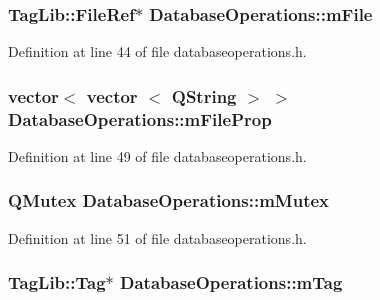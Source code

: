 \hypertarget{class_database_operations_af61f0200ac06733bbd9276faf9fa4488}{
\subsubsection[{m\-File}]{\setlength{\rightskip}{0pt plus 5cm}Tag\-Lib\-::\-File\-Ref$\ast$ Database\-Operations\-::m\-File\hspace{0.3cm}{\ttfamily [protected]}}}\label{class_database_operations_af61f0200ac06733bbd9276faf9fa4488}


Definition at line 44 of file databaseoperations.\-h.

\hypertarget{class_database_operations_a27137305ac34557b97fdffd8e17a9be2}{
\subsubsection[{m\-File\-Prop}]{\setlength{\rightskip}{0pt plus 5cm}vector$<$ vector $<$ Q\-String $>$ $>$ Database\-Operations\-::m\-File\-Prop\hspace{0.3cm}{\ttfamily [protected]}}}\label{class_database_operations_a27137305ac34557b97fdffd8e17a9be2}


Definition at line 49 of file databaseoperations.\-h.

\hypertarget{class_database_operations_a527401ca7671c2856b6368cad0c1c3a7}{
\subsubsection[{m\-Mutex}]{\setlength{\rightskip}{0pt plus 5cm}Q\-Mutex Database\-Operations\-::m\-Mutex\hspace{0.3cm}{\ttfamily [protected]}}}\label{class_database_operations_a527401ca7671c2856b6368cad0c1c3a7}


Definition at line 51 of file databaseoperations.\-h.

\hypertarget{class_database_operations_a4ee540c45bc895889be44c652693d0e5}{
\subsubsection[{m\-Tag}]{\setlength{\rightskip}{0pt plus 5cm}Tag\-Lib\-::\-Tag$\ast$ Database\-Operations\-::m\-Tag\hspace{0.3cm}{\ttfamily [protected]}}}\label{class_database_operations_a4ee540c45bc895889be44c652693d0e5}


